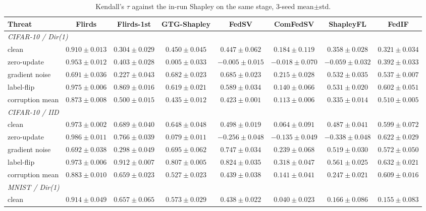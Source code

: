 \documentclass[letterpaper]{article} %
\theoremstyle{plain}
\begin{document}
\begin{table}[t]
\centering
\small
\setlength{\tabcolsep}{4pt}
\caption{Kendall's $\tau$ against the in-run Shapley on the same stage,
3-seed mean$\pm$std.}
\label{tab:kendall-main}
\begin{tabular}{lccccccc}
\hline
Threat & Flirds & Flirds-1st & GTG-Shapley & FedSV & ComFedSV & ShapleyFL & FedIF \\
\hline
\multicolumn{8}{l}{\emph{CIFAR-10 / Dir(1)}} \\
clean & $0.910\pm0.013$ & $0.304\pm0.029$ & $0.450\pm0.045$ & $0.447\pm0.062$ & $0.184\pm0.119$ & $0.358\pm0.028$ & $0.321\pm0.034$ \\
zero-update & $0.953\pm0.012$ & $0.403\pm0.028$ & $0.005\pm0.033$ & $-0.005\pm0.015$ & $-0.018\pm0.070$ & $-0.059\pm0.032$ & $0.392\pm0.033$ \\
gradient noise & $0.691\pm0.036$ & $0.227\pm0.043$ & $0.682\pm0.023$ & $0.685\pm0.023$ & $0.215\pm0.028$ & $0.532\pm0.035$ & $0.537\pm0.007$ \\
label-flip & $0.975\pm0.006$ & $0.869\pm0.016$ & $0.619\pm0.021$ & $0.589\pm0.034$ & $0.140\pm0.066$ & $0.531\pm0.020$ & $0.602\pm0.051$ \\
corruption mean & $0.873\pm0.008$ & $0.500\pm0.015$ & $0.435\pm0.012$ & $0.423\pm0.001$ & $0.113\pm0.006$ & $0.335\pm0.014$ & $0.510\pm0.005$ \\
\hline
\multicolumn{8}{l}{\emph{CIFAR-10 / IID}} \\
clean & $0.973\pm0.002$ & $0.689\pm0.040$ & $0.648\pm0.048$ & $0.498\pm0.019$ & $0.064\pm0.091$ & $0.487\pm0.041$ & $0.599\pm0.072$ \\
zero-update & $0.986\pm0.011$ & $0.766\pm0.039$ & $0.079\pm0.011$ & $-0.256\pm0.048$ & $-0.135\pm0.049$ & $-0.338\pm0.048$ & $0.622\pm0.029$ \\
gradient noise & $0.692\pm0.038$ & $0.298\pm0.049$ & $0.695\pm0.062$ & $0.747\pm0.034$ & $0.239\pm0.068$ & $0.519\pm0.030$ & $0.572\pm0.050$ \\
label-flip & $0.973\pm0.006$ & $0.912\pm0.007$ & $0.807\pm0.005$ & $0.824\pm0.035$ & $0.318\pm0.047$ & $0.561\pm0.025$ & $0.632\pm0.021$ \\
corruption mean & $0.883\pm0.010$ & $0.659\pm0.023$ & $0.527\pm0.023$ & $0.439\pm0.038$ & $0.141\pm0.041$ & $0.247\pm0.021$ & $0.609\pm0.016$ \\
\hline
\multicolumn{8}{l}{\emph{MNIST / Dir(1)}} \\
clean & $0.914\pm0.049$ & $0.657\pm0.065$ & $0.573\pm0.029$ & $0.438\pm0.022$ & $0.040\pm0.023$ & $0.166\pm0.086$ & $0.155\pm0.083$ \\

\end{tabular}
\end{table}
\end{document}
